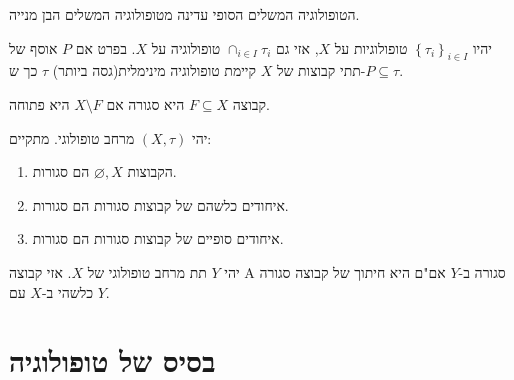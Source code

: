 \documentclass{tstextbook}
\begin{document}
\begin{proposition}
הטופולוגיה המשלים הסופי עדינה מטופולוגיה המשלים הבן מנייה.

\end{proposition}
\begin{example}
יהיו \(\left\{  \tau_{i}  \right\}_{i\in I}\) טופולוגיות על \(X\), אזי גם \(\cap_{i \in I}\tau_{i}\) טופולוגיה על \(X\). בפרט אם \(P\) אוסף של תתי קבוצות של \(X\) קיימת טופולוגיה מינימלית(גסה ביותר) \(\tau\) כך ש-\(P\subseteq \tau\).

\end{example}
\begin{definition}
קבוצה \(F\subseteq X\) היא סגורה אם \(X\setminus F\) היא פתוחה.

\end{definition}
\begin{proposition}
יהי \((X,\tau)\) מרחב טופולוגי. מתקיים:

  \begin{enumerate}
    \item הקבוצות \(\varnothing,X\) הם סגורות. 


    \item איחודים כלשהם של קבוצות סגורות הם סגורות. 


    \item איחודים סופיים של קבוצות סגורות הם סגורות. 


  \end{enumerate}
\end{proposition}
\begin{proposition}
יהי \(Y\) תת מרחב טופולוגי של \(X\). אזי קבוצה A סגורה ב-\(Y\) אם"ם היא חיתוך של קבוצה סגורה כלשהי ב-\(X\) עם \(Y\).

\end{proposition}
\section{בסיס של טופולוגיה}
\end{document}
